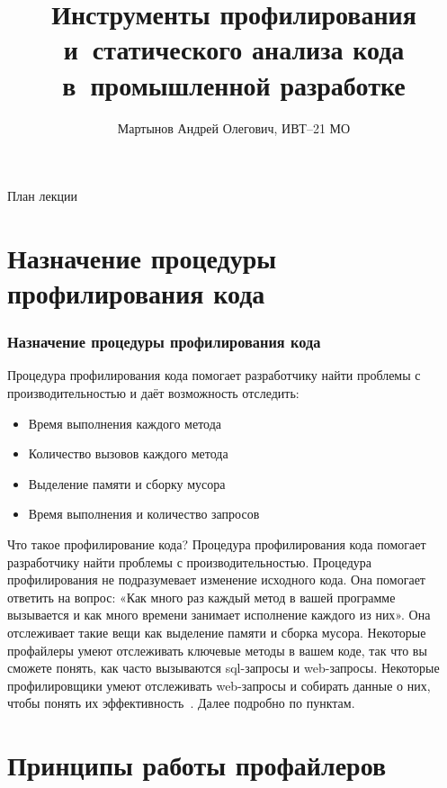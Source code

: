 \documentclass{../industrial-development}
\title{Инструменты профилирования и~статического анализа кода в~промышленной разработке}
\author{Мартынов Андрей Олегович, ИВТ--21 МО}
\date{}
\begin{document}
\begin{frame}
  \titlepage
\end{frame}

\begin{frame}{План лекции}
	\tableofcontents
\end{frame}

\section{Назначение процедуры профилирования кода}

\begin{frame} \frametitle{Назначение процедуры профилирования кода}
  \begin{block}{}
    \alert{Процедура профилирования кода} помогает разработчику найти проблемы с производительностью и даёт возможность отследить:
	\end{block}
  
  \begin{itemize}
  \item Время выполнения каждого метода
  \item Количество вызовов каждого метода
  \item Выделение памяти и сборку мусора
  \item Время выполнения и количество запросов
  \end{itemize}
\end{frame}

\lecturenotes
Что такое профилирование кода? Процедура профилирования кода помогает разработчику найти проблемы с производительностью. Процедура профилирования не подразумевает изменение исходного кода. Она помогает ответить на вопрос: «Как много раз каждый метод в вашей программе вызывается и как много времени занимает исполнение каждого из них». Она отслеживает такие вещи как выделение памяти и сборка мусора. Некоторые профайлеры умеют отслеживать ключевые методы в вашем коде, так что вы сможете понять, как часто вызываются sql-запросы и web-запросы. Некоторые профилировщики умеют отслеживать web-запросы и собирать данные о них, чтобы понять их эффективность~\cite{Profiling}. Далее подробно по пунктам.

\section{Принципы работы профайлеров}
\end{document}
